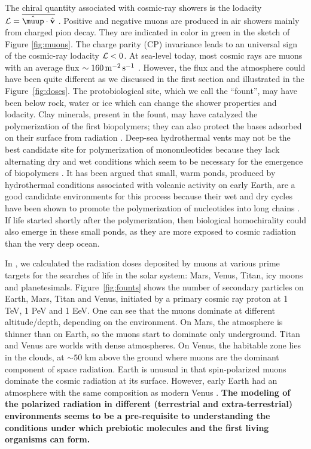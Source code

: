 \documentclass[a4paper,11pt]{article}
\begin{document}
The chiral quantity associated with cosmic-ray showers is the lodacity ${\cal L}=\overline{\hat{\boldsymbol{\muup}}\cdot\hat{\textbf v}}$ \cite{GB20}.
Positive and negative muons  are produced in air showers mainly from charged pion decay. They are indicated in color in green in the sketch of Figure \ref{fig:muons}. The charge parity (CP) invariance leads to an universal sign of the cosmic-ray lodacity ${\cal L}<0$. 
At sea-level today, most cosmic rays are muons with an average flux $\sim160\,{\rm m}^{-2}\,{\rm s}^{-1}$  \cite{1993APh.....1..195L}. However, the flux and the atmosphere could have been quite different as we discussed in the first section and illustrated in the Figure~\ref{fig:doses}. The protobiological site, which we call the ``fount'', may have been below rock, water or ice which can change the shower properties and lodacity. Clay minerals, present in the fount, may have catalyzed the polymerization of the first biopolymers; they can also protect the  bases adsorbed on their surface from radiation \cite{biondi2007}. Deep-sea hydrothermal vents may not be the best candidate site for  polymerization of mononuleotides because they lack alternating dry and wet conditions which seem to be necessary for the emergence of biopolymers \cite{Damer20}. It has been argued that small, warm ponds, produced by hydrothermal conditions associated with volcanic activity on early Earth, are a good candidate environments for this process because their wet and dry cycles have been shown to promote the polymerization of nucleotides into long chains \cite{DaSilva15}. If life started shortly after the polymerization, then biological homochirality could also emerge in these small ponds, as they are more exposed to cosmic radiation than the very deep ocean.


In \cite{GFB21}, we calculated the radiation doses deposited by muons at various prime targets for the searches of life in the solar system: Mars, Venus, Titan, icy moons and planetesimals.  Figure~\ref{fig:founts} shows the number of secondary particles on Earth, Mars, Titan and Venus, initiated by a primary cosmic ray proton at 1 TeV, 1 PeV and 1 EeV. One can see that the muons dominate at different altitude/depth, depending on the environment. On Mars, the atmosphere is thinner than on Earth, so the muons start to dominate only underground.   Titan and Venus are worlds with dense atmospheres.  On Venus, the habitable zone lies in the clouds, at $\sim50$ km above the ground where  muons are the dominant component of space radiation. Earth is unusual in that spin-polarized muons dominate the cosmic radiation at its surface. However, early Earth had an atmosphere with the same composition as modern Venus \cite{Sossi20}. {\bf The modeling of the polarized radiation in different (terrestrial and extra-terrestrial) environments seems to be a pre-requisite to understanding the conditions under which prebiotic molecules and the first living organisms can form. }
\end{document}
